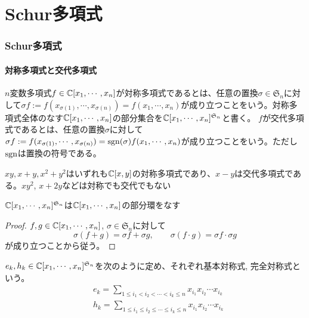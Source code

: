 \documentclass{ltjsarticle}
\begin{document}
\part{Schur多項式}
\section{Schur多項式}
\subsection{対称多項式と交代多項式}
\begin{defin}
    $n$変数多項式$f\in\mathbb{C}[x_1,\cdots,x_n]$が対称多項式であるとは、任意の置換$\sigma\in\mathfrak{S}_n$に対して$\sigma f:=f(x_{\sigma(1)},\cdots,x_{\sigma(n)})=f(x_1,\cdots,x_n)$が成り立つことをいう。対称多項式全体のなす$\mathbb{C}[x_1,\cdots,x_n]$の部分集合を$\mathbb{C}[x_1,\cdots,x_n]^{\mathfrak{S}_n}$と書く。
    $f$が交代多項式であるとは、任意の置換$\sigma$に対して$\sigma f:=f(x_{\sigma(1)},\cdots,x_{\sigma(n)})=\mathrm{sgn}(\sigma)f(x_1,\cdots,x_n)$が成り立つことをいう。ただし$\mathrm{sgn}$は置換の符号である。
\end{defin}

\begin{eg}
    $xy, x+y, x^2+y^2$はいずれも$\mathbb{C}[x,y]$の対称多項式であり、$x-y$は交代多項式である。$xy^2$, $x+2y$などは対称でも交代でもない
\end{eg}

\begin{prop}
    $\mathbb{C}[x_1,\cdots,x_n]^{\mathfrak{S}_n}$は$\mathbb{C}[x_1,\cdots,x_n]$の部分環をなす
\end{prop}

\begin{proof}
    $f,g\in\mathbb{C}[x_1,\cdots,x_n]$, $\sigma\in\mathfrak{S}_n$に対して
    \[
    \sigma(f+g)=\sigma f+\sigma g,\qquad \sigma(f\cdot g)=\sigma f\cdot \sigma g    
    \]
    が成り立つことから従う。
\end{proof}

\begin{defin}
    $e_k, h_k\in\mathbb{C}[x_1,\cdots,x_n]^{\mathfrak{S}_n}$を次のように定め、それぞれ基本対称式, 完全対称式という。
    \begin{align*}
        &e_k=\sum_{1\leq i_1<i_2<\cdots<i_k\leq n}x_{i_1}x_{i_2}\cdots x_{i_k}\\
        &h_k=\sum_{1\leq i_1\leq i_2\leq\cdots\leq i_k\leq n}x_{i_1}x_{i_2}\cdots x_{i_k}
    \end{align*}
\end{defin}
\end{document}
